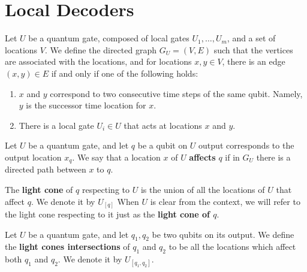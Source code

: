 
\section{Local Decoders}
\begin{definition}[Locations]

  
\end{definition}

\begin{definition}
Let $U$ be a quantum gate, composed of local gates $U_{1}, \ldots, U_{m}$, and a set of locations $V$. We define the directed graph $G_{U} = (V,E)$ such that the vertices are associated with the locations, and for locations $x,y \in V$, there is an edge $(x,y) \in E$ if and only if one of the following holds:
  \begin{enumerate}
    \item $x$ and $y$ correspond to two consecutive time steps of the same qubit. Namely, $y$ is the successor time location for $x$.
    \item There is a local gate $U_{i} \in U$ that acts at locations $x$ and $y$.
  \end{enumerate} 
\end{definition}

\begin{definition} Let $U$ be a quantum gate, and let $q$ be a qubit on $U$ output corresponds to the output location $x_{q}$. We say that a location $x$ of $U$ \textbf{affects} $q$ if in $G_{U}$ there is a directed path between $x$ to $q$.  

  The \textbf{light cone} of $q$ respecting to $U$ is the union of all the locations of $U$ that affect $q$. We denote it by $U_{[q]}$ When $U$ is clear from the context, we will refer to the light cone respecting to it just as the \textbf{light cone of $q$}.
  
\end{definition}

\begin{definition} 
  Let $U$ be a quantum gate, and let $q_{1}, q_{2}$ be two qubits on its output. We define the \textbf{light cones intersections} of $q_{1}$ and $q_{2}$ to be all the locations which affect both $q_{1}$ and $q_{2}$. We denote it by $U_{[q_{1},q_{2}]}$.  
  
\end{definition}


